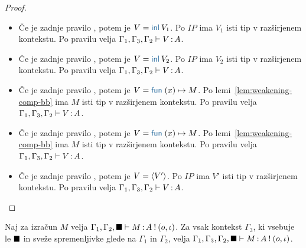 \begin{proof}
\begin{itemize}
		\item Če je zadnje pravilo , potem je $V = \tminl{V_1}$.
		Po $IP$ ima $V_1$ isti tip v razširjenem kontekstu.
		Po pravilu  velja $\Gamma_1, \Gamma_3, \Gamma_2 \vdash V \mathinner{:} A$.
		
		\item Če je zadnje pravilo , potem je $V = \tminl{V_2}$.
		Po $IP$ ima $V_2$ isti tip v razširjenem kontekstu.
		Po pravilu  velja $\Gamma_1, \Gamma_3, \Gamma_2 \vdash V \mathinner{:} A$.
		
		\item Če je zadnje pravilo , potem je $V = \tmfun{x}{M}$.
		Po lemi~\ref{lem:weakening-comp-bb} ima $M$ isti tip v razširjenem kontekstu.
		Po pravilu  velja $\Gamma_1, \Gamma_3, \Gamma_2 \vdash V \mathinner{:} A$.
		
		\item Če je zadnje pravilo , potem je $V = \tmfun{x}{M}$.
		Po lemi~\ref{lem:weakening-comp-bb} ima $M$ isti tip v razširjenem kontekstu.
		Po pravilu  velja $\Gamma_1, \Gamma_3, \Gamma_2 \vdash V \mathinner{:} A$.
		
		\item Če je zadnje pravilo , potem je $V =\langle V' \rangle$.
		Po $IP$ ima $V'$ isti tip v razširjenem kontekstu.
		Po pravilu  velja $\Gamma_1, \Gamma_3, \Gamma_2 \vdash V \mathinner{:} A$.
	\end{itemize}
\end{proof}


\begin{lema}\label{lem:weakening-comp-bb}
	Naj za izračun $M$ velja $\Gamma_1, \Gamma_2, \blacksquare \vdash M \mathinner{:} A \mathbin{!} (o, \iota)$.
	Za vsak kontekst $\Gamma_3$, ki vsebuje le $\blacksquare$ in sveže spremenljivke glede na $\Gamma_1$ in $\Gamma_2$, velja $\Gamma_1, \Gamma_3, \Gamma_2, \blacksquare \vdash M \mathinner{:} A \mathbin{!} (o, \iota)$.
\end{lema}


